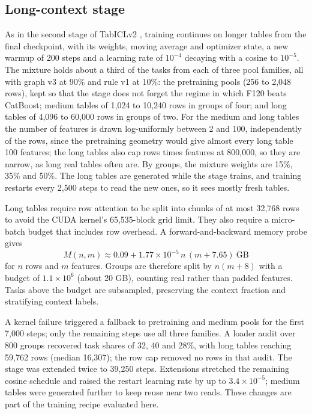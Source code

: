 \documentclass[11pt]{article}
\begin{document}
\subsection{Long-context stage}
As in the second stage of TabICLv2 \cite{tabiclv2}, training continues on longer tables from the final
checkpoint, with its weights, moving average and optimizer state, a new warmup of 200 steps and a
learning rate of $10^{-4}$ decaying with a cosine to $10^{-5}$. The mixture holds about a third of the
tasks from each of three pool families, all with graph v3 at 90\% and rule v1 at 10\%: the pretraining
pools (256 to 2,048 rows), kept so that the stage does not forget the regime in which F120 beats
CatBoost; medium tables of 1,024 to 10,240 rows in groups of four; and long tables of 4,096 to 60,000
rows in groups of two. For the medium and long tables the number of features is drawn log-uniformly
between 2 and 100, independently of the rows, since the pretraining geometry would give almost every
long table 100 features; the long tables also cap rows times features at 800,000, so they are narrow,
as long real tables often are. By groups, the mixture weights are 15\%, 35\% and 50\%. The long tables
are generated while the stage trains, and training restarts every 2,500 steps to read the new ones, so
it sees mostly fresh tables.

Long tables require row attention to be split into chunks of at most 32,768 rows to avoid the CUDA
kernel's 65,535-block grid limit. They also require a micro-batch budget that includes row overhead.
A forward-and-backward memory probe gives
\begin{equation}
M(n,m)\approx 0.09+1.77\times10^{-5}\,n\,(m+7.65)\ \text{GB}
\end{equation}
for $n$ rows and $m$ features. Groups are therefore split by $n(m+8)$ with a budget of
$1.1\times10^6$ (about 20 GB), counting real rather than padded features. Tasks above the budget are
subsampled, preserving the context fraction and stratifying context labels.

A kernel failure triggered a fallback to pretraining and medium pools for the first 7,000 steps;
only the remaining steps use all three families. A loader audit over 800 groups recovered task shares
of 32, 40 and 28\%, with long tables reaching 59,762 rows (median 16,307); the row cap removed no rows
in that audit. The stage was extended twice to 39,250 steps. Extensions stretched the remaining cosine
schedule and raised the restart learning rate by up to $3.4\times10^{-5}$; medium tables were generated
further to keep reuse near two reads. These changes are part of the training recipe evaluated here.
\end{document}
